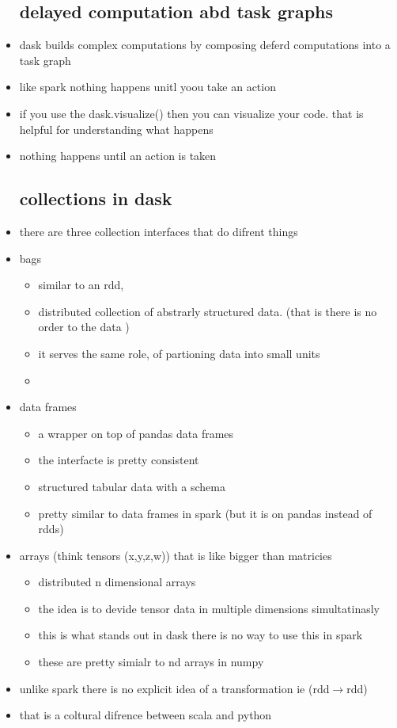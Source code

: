 \documentclass{article}
\begin{document}
\begin{itemize}
\subsection{delayed computation abd task graphs}
\item dask builds complex computations by composing deferd computations into a task graph 
\item like spark nothing happens unitl yoou take an action 
\item if you use the dask.visualize() then you can visualize your code. that is helpful for understanding what happens 
\item nothing happens until an action is taken
\subsection{collections in dask} 
\item there are three collection interfaces that do difrent things 
\item bags
\begin{itemize}
    \item similar to an rdd, 
    \item distributed collection of abstrarly structured data. (that is there is no order to the data )
    \item it serves the same role, of partioning data into small units
    \item 
\end{itemize}
\item data frames
\begin{itemize}
    \item a wrapper on top of pandas data frames 
    \item the interfacte is pretty consistent 
    \item structured tabular data with a schema
    \item pretty similar to data frames in spark (but it is on pandas instead of rdds)
\end{itemize}
\item arrays (think tensors (x,y,z,w)) that is like bigger than matricies 
\begin{itemize}
    \item distributed n dimensional arrays
    \item the idea is to devide tensor data in multiple dimensions simultatinasly
    \item this is what stands out in dask there is no way to use this in spark
    \item these are pretty simialr to nd arrays in numpy 
\end{itemize}
\item unlike spark there is no explicit idea of a transformation ie (rdd$\rightarrow$rdd)
\item that is a coltural difrence between scala and python

\end{itemize}
\end{document}
